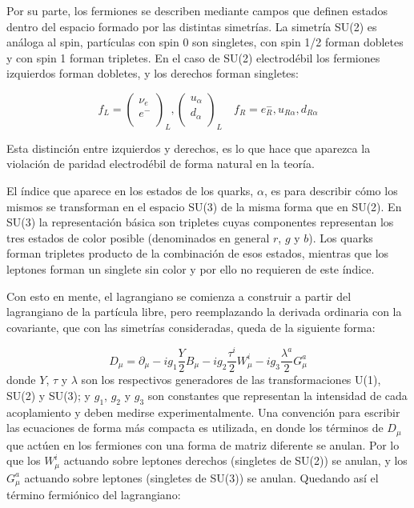 Por su parte, los fermiones se describen mediante campos que definen estados dentro del espacio formado por las distintas simetrías. La simetría SU(2) es análoga al spin, partículas con spin 0 son singletes, con spin 1/2 forman dobletes y con spin 1 forman tripletes. En el caso de SU(2) electrodébil los fermiones izquierdos forman dobletes, y los derechos forman singletes:

\begin{equation}
	f_L = 
	\begin{pmatrix}
	\nu_{e} \\
	e^{-} \\
	\end{pmatrix}_{L},
	\begin{pmatrix}
	u_\alpha \\
	d_\alpha \\
	\end{pmatrix}_{L}
	\quad
	f_R = e^{-}_{R},u_{R\alpha},d_{R\alpha}
\end{equation}

Esta distinción entre izquierdos y derechos, es lo que hace que aparezca la violación de paridad electrodébil de forma natural en la teoría.

El índice que aparece en los estados de los quarks, $\alpha$, es para describir cómo los mismos se transforman en el espacio SU(3) de la misma forma que en SU(2). En SU(3) la representación básica son tripletes cuyas componentes representan los tres estados de color posible (denominados en general $r$, $g$ y $b$). Los quarks forman tripletes producto de la combinación de esos estados, mientras que los leptones forman un singlete sin color y por ello no requieren de este índice.

Con esto en mente, el lagrangiano se comienza a construir a partir del lagrangiano de la partícula libre, pero reemplazando la derivada ordinaria con la covariante, que con las simetrías consideradas, queda de la siguiente forma:


\begin{equation}
D_{\mu} = \partial_{\mu} - i g_{1} \frac{Y}{2}B_{\mu} - i g_{2} \frac{\tau^{i}}{2}W_{\mu}^{i} - i g_{3} \frac{\lambda^{a}}{2}G_{\mu}^{a}
\end{equation}
%
donde $Y$, $\tau$ y $\lambda$ son los respectivos generadores de las transformaciones U(1), SU(2) y SU(3); y $g_1$, $g_2$ y $g_3$ son constantes que representan la intensidad de cada acoplamiento y deben medirse experimentalmente. Una convención para escribir las ecuaciones de forma más compacta es utilizada, en donde los términos de $D_{\mu}$ que actúen en los fermiones con una forma de matriz diferente se anulan. Por lo que los $W_{\mu}^{i}$ actuando sobre leptones derechos (singletes de SU(2)) se anulan, y los $G_{\mu}^{a}$ actuando sobre leptones (singletes de SU(3)) se anulan. Quedando así el término fermiónico del lagrangiano:

